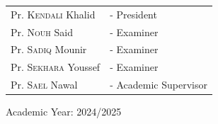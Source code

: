 \begin{titlepage}
\begin{tabular}{ll}
    \large Pr. \textsc{Kendali} Khalid & \large - President \\
    \large Pr. \textsc{Nouh} Said & \large - Examiner \\
    \large Pr. \textsc{Sadiq}  Mounir & \large - Examiner \\
    \large Pr. \textsc{Sekhara} Youssef & \large - Examiner \\
   
 
    \large Pr. \textsc{Sael} Nawal  & \large - Academic Supervisor \\
\end{tabular}

    \vspace{1cm} %

    {\large Academic Year: 2024/2025}

\end{titlepage}